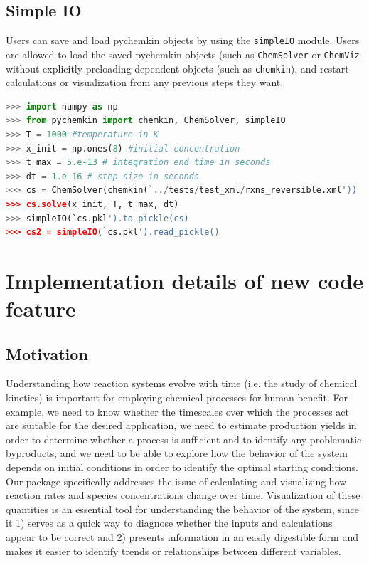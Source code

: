 \documentclass[12pt]{article}
\begin{document}
\subsection{Simple IO}
Users can save and load pychemkin objects by using the \texttt{simpleIO} module. Users are allowed to load the saved pychemkin objects (such as \texttt{ChemSolver} or \texttt{ChemViz} without explicitly preloading dependent objects (such as \texttt{chemkin}), and restart calculations or visualization from any previous steps they want.

\begin{lstlisting}[language = Python, basicstyle = \ttfamily,columns = fullflexible, showstringspaces = False]
>>> import numpy as np
>>> from pychemkin import chemkin, ChemSolver, simpleIO
>>> T = 1000 #temperature in K
>>> x_init = np.ones(8) #initial concentration
>>> t_max = 5.e-13 # integration end time in seconds
>>> dt = 1.e-16 # step size in seconds
>>> cs = ChemSolver(chemkin(`../tests/test_xml/rxns_reversible.xml'))
>>> cs.solve(x_init, T, t_max, dt)
>>> simpleIO(`cs.pkl').to_pickle(cs)
>>> cs2 = simpleIO(`cs.pkl').read_pickle()
\end{lstlisting}

\section{Implementation details of new code feature}
\subsection{Motivation}
Understanding how reaction systems evolve with time (i.e. the study of chemical kinetics) is important for employing chemical processes for human benefit. For example, we need to know whether the timescales over which the processes act are suitable for the desired application, we need to estimate production yields in order to determine whether a process is sufficient and to identify any problematic byproducts, and we need to be able to explore how the behavior of the system depends on initial conditions in order to identify the optimal starting conditions. Our package specifically addresses the issue of calculating and visualizing how reaction rates and species concentrations change over time. Visualization of these quantities is an essential tool for understanding the behavior of the system, since it 1) serves as a quick way to diagnose whether the inputs and calculations appear to be correct and 2) presents information in an easily digestible form and makes it easier to identify trends or relationships between different variables. 
\end{document}
